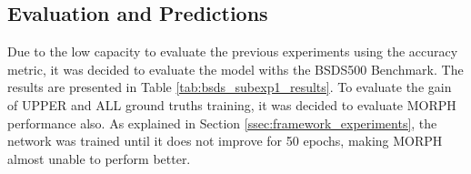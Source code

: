 % 
% 

\subsection{Evaluation and Predictions}
\label{ssec:basic_pred_eval}

Due to the low capacity to evaluate the previous experiments using the accuracy metric, it was decided to evaluate the model withs the BSDS500 Benchmark.
The results are presented in Table \ref{tab:bsds_subexp1_results}.
To evaluate the gain of UPPER and ALL ground truths training, it was decided to evaluate MORPH performance also.
As explained in Section \ref{ssec:framework_experiments}, the network was trained until it does not improve for 50 epochs, making MORPH almost unable to perform better.


